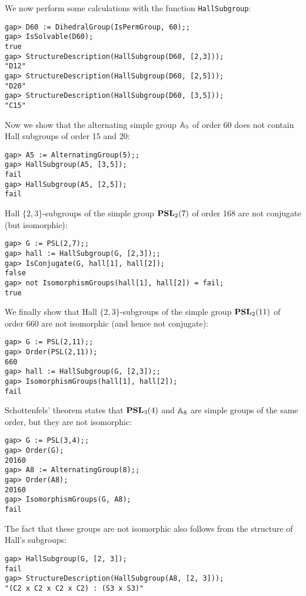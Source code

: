 \begin{example}
We now perform some calculations
with the function \lstinline{HallSubgroup}:
\begin{lstlisting}
gap> D60 := DihedralGroup(IsPermGroup, 60);;
gap> IsSolvable(D60);
true
gap> StructureDescription(HallSubgroup(D60, [2,3]));
"D12"
gap> StructureDescription(HallSubgroup(D60, [2,5]));
"D20"
gap> StructureDescription(HallSubgroup(D60, [3,5]));
"C15"
\end{lstlisting}

Now we show that the alternating simple group $\mathbb{A}_5$ 
of order 60 does not contain 
Hall subgroups of order 15 and 20: 
\begin{lstlisting}
gap> A5 := AlternatingGroup(5);;
gap> HallSubgroup(A5, [3,5]);
fail
gap> HallSubgroup(A5, [2,5]);
fail
\end{lstlisting}

Hall $\{2,3\}$-subgroups of the simple group $\mathbf{PSL}_2(7)$ of order 168 
are not conjugate (but isomorphic):  
\begin{lstlisting}
gap> G := PSL(2,7);;
gap> hall := HallSubgroup(G, [2,3]);;
gap> IsConjugate(G, hall[1], hall[2]);
false
gap> not IsomorphismGroups(hall[1], hall[2]) = fail;
true
\end{lstlisting}

We finally show that Hall $\{2,3\}$-subgroups of the 
simple group $\mathbf{PSL}_2(11)$ of order 660 
are not isomorphic (and hence not conjugate): 
\begin{lstlisting}
gap> G := PSL(2,11);;
gap> Order(PSL(2,11));
660
gap> hall := HallSubgroup(G, [2,3]);;
gap> IsomorphismGroups(hall[1], hall[2]);
fail
\end{lstlisting}    
\end{example}

\begin{example}
    Schottenfels' theorem \cite[Theorem 8.24]{MR1307623} 
    states that $\mathbf{PSL}_3(4)$ and $\mathbb{A}_8$ are simple 
    groups of the same order, but they are not isomorphic: 
\begin{lstlisting}
gap> G := PSL(3,4);;
gap> Order(G);
20160
gap> A8 := AlternatingGroup(8);;
gap> Order(A8);
20160
gap> IsomorphismGroups(G, A8);
fail
\end{lstlisting}
The fact that these groups are not isomorphic also follows
from the structure of Hall's subgroups:
\begin{lstlisting}
gap> HallSubgroup(G, [2, 3]);
fail
gap> StructureDescription(HallSubgroup(A8, [2, 3]));
"(C2 x C2 x C2 x C2) : (S3 x S3)"
\end{lstlisting}
\end{example}

